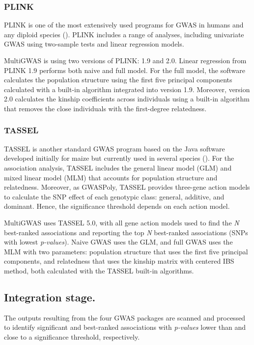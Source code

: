 \documentclass{article}
\begin{document}
\subsubsection{PLINK}

PLINK is one of the most extensively used programs for GWAS in humans and any diploid species (\cite{Power2016}). PLINK includes a range of analyses, including univariate GWAS using two-sample tests and linear regression models.

MultiGWAS is using two versions of PLINK: 1.9 and 2.0. Linear regression from PLINK 1.9 performs both naive and full model. For the full model, the software calculates the population structure using the first five principal components calculated with a built-in algorithm integrated into version 1.9. Moreover, version 2.0 calculates the kinship coefficients across individuals using a built-in algorithm that removes the close individuals with the first-degree relatedness.

\subsubsection{TASSEL\label{subsec_TASSEL}}

TASSEL is another standard GWAS program based on the Java software developed initially for maize but currently used in several species (\cite{Alvarez2017, Zhang2018}). For the association analysis, TASSEL includes the general linear model (GLM) and mixed linear model (MLM) that accounts for population structure and relatedness. Moreover, as GWASPoly, TASSEL provides three-gene action models to calculate the SNP effect of each genotypic class: general, additive, and dominant. Hence, the significance threshold depends on each action model.

MultiGWAS uses TASSEL 5.0, with all gene action models used to find the \emph{N} best-ranked associations and reporting the top \emph{N} best-ranked associations (SNPs with lowest \emph{p-values}). Naive GWAS uses the GLM, and full GWAS uses the MLM with two parameters: population structure that uses the first five principal components, and relatedness that uses the kinship matrix with centered IBS method, both calculated with the TASSEL built-in algorithms. 


\subsection{Integration stage.}
The outputs resulting from the four GWAS packages are scanned and processed to identify significant and best-ranked associations with \emph{p-values} lower than and close to a significance threshold, respectively. 
\end{document}

